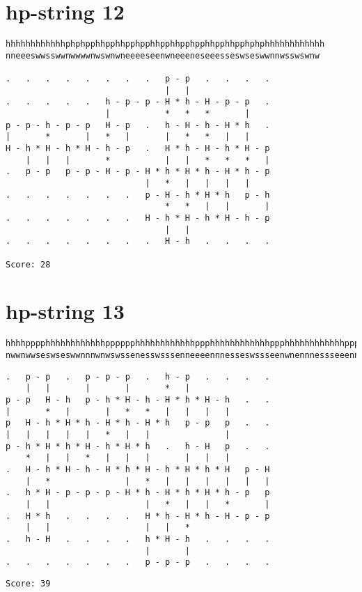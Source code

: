 \documentclass[a4paper,oneside,article,11pt]{memoir}
\begin{document}
\section*{hp-string 12}
\begin{lstlisting}[basicstyle=\ttfamily]
hhhhhhhhhhhhphphpphhpphhpphpphhpphhpphpphhpphhpphphphhhhhhhhhhhh
nneeeswwsswwnwwwwnwswnwneeeeseenwneeeneseeesseswseswwnnwsswswnw

.   .   .   .   .   .   .   .   p - p   .   .   .   .  
                                |   |                  
.   .   .   .   .   h - p - p - H * h - H - p - p   .  
                    |           *   *   *       |      
p - p - h - p - p   H - p   .   h - H - h - H * h   .  
|       *       |   *   |       |   *   *   |   |      
H - h * H - h * H - h - p   .   H * h - H - h * H - p  
    |   |   |       *           |   |   *   *   *   |  
.   p - p   p - p - H - p - H * h * H * h - H * h - p  
                            |   *   |   |   |   |      
.   .   .   .   .   .   .   p - H - h * H * h   p - h  
                                *   *   |   |       |  
.   .   .   .   .   .   .   H - h * H - h * H - h - p  
                                |   |                  
.   .   .   .   .   .   .   .   H - h   .   .   .   .

Score: 28
\end{lstlisting}

\pagebreak

\section*{hp-string 13}
\begin{lstlisting}[basicstyle=\fontsize{7}{11}\ttfamily]
hhhhpppphhhhhhhhhhhhpppppphhhhhhhhhhhhppphhhhhhhhhhhhppphhhhhhhhhhhhppphpphhpphhpphph
nwwnwwseswseswwnnnwnwswssenesswsssenneeeennnesseswssseenwnennnessseeennwswnnnnwswnnw
\end{lstlisting}
\begin{lstlisting}[basicstyle=\fontsize{11}{11}\ttfamily]
.   p - p   .   p - p - p   .   h - p   .   .   .   .  
    |   |       |       |       *   |                  
p - p   H - h   p - h * H - h - H * h * H - h   .   .  
|       *   |       |   *   *   |   |   |   |          
p   H - h * H * h - H * h - H * h   p - p   p   .   .  
|   |   |   |   |   *   |   |               |          
p - h * H * h * H - h * H * h   .   h - H   p   .   .  
    *   |   |   *   |   |   |       |   |   |          
.   H - h * H - h - H * h * H - h * H * h * H   p - H  
    |   *               |   *   |   |   |   |   |   |  
.   h * H - p - p - p - H * h - H * h * H * h - p   p  
    |   |                   |   *   |   |   *       |  
.   H * h   .   .   .   .   H * h - H * h - H - p - p  
    |   |                   |   |   *                  
.   h - H   .   .   .   .   h * H - h   .   .   .   .  
                            |       |                  
.   .   .   .   .   .   .   p - p - p   .   .   .   .
\end{lstlisting}
\begin{lstlisting}
Score: 39
\end{lstlisting}
\end{document}
